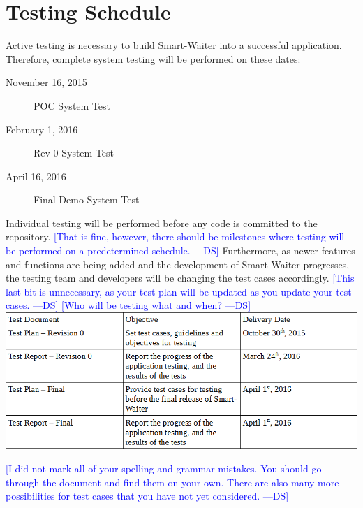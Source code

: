 \documentclass[12pt]{article}
\newcommand{\authornote}[3]{\textcolor{#1}{[#3 ---#2]}}
\newcommand{\authornote}[3]{}
\newcommand{\ds}[1]{\authornote{blue}{DS}{#1}}
\begin{document}
\section{Testing Schedule}
Active testing is necessary to build Smart-Waiter into a successful application. Therefore, complete system testing will be performed on these dates: 
\begin{description}
\item [November 16, 2015] POC System Test
\item [February 1, 2016] Rev 0 System Test
\item [April 16, 2016] Final Demo System Test
\end{description}
Individual testing will be performed before any code is committed to the repository.
\ds{That is fine, however, there should be milestones where testing will be performed 
on a predetermined schedule.}
Furthermore, as newer features and functions are being added and the development of Smart-Waiter progresses, the testing team and developers will be changing the test cases accordingly. 
\ds{This last bit is unnecessary, as your test plan will be updated as you
update your test cases.}
\newline
\ds{Who will be testing what and when?}
\newline
\includegraphics[width=\textwidth,height=\textheight,keepaspectratio]{TestingSchedule.png}

\ds{I did not mark all of your spelling and grammar mistakes. You should go 
through the document and find them on your own. There are also many more possibilities
for test cases that you have not yet considered.}
\end{document}
